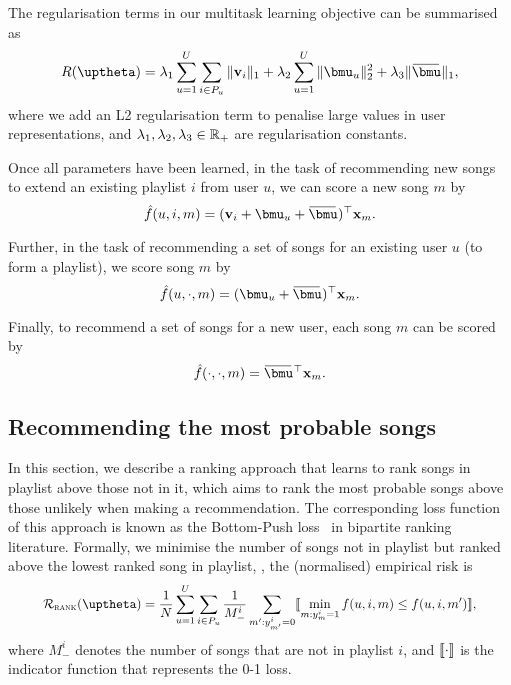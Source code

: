 The regularisation terms in our multitask learning objective can be summarised as
\begin{equation}
\label{eq:reg}
R(\uptheta) = \lambda_1 \sum_{u=1}^U \sum_{i \in P_u} \|\bv_i\|_1 + \lambda_2 \sum_{u=1}^U \|\bmu_u\|_2^2 + \lambda_3 \|\widebar\bmu\|_1,
\end{equation}
where we add an L2 regularisation term to penalise large values in user representations,
and $\lambda_1, \lambda_2, \lambda_3 \in \mathbb{R}_+$ are regularisation constants.

Once all parameters have been learned, in the task of recommending new songs to extend an existing playlist $i$ from user $u$, 
we can score a new song $m$ by
$$
\hat f(u, i, m) = (\bv_i + \bmu_u + \widebar\bmu)^\top \x_m.
$$

Further, in the task of recommending a set of songs for an existing user $u$ (to form a playlist), 
we score song $m$ by
$$
\hat f(u, \cdot, m) = (\bmu_u + \widebar\bmu)^\top \x_m.
$$

Finally, to recommend a set of songs for a new user, each song $m$ can be scored by
$$
\hat f(\cdot, \cdot, m) = \widebar\bmu^\top \x_m.
$$


\subsection{Recommending the most probable songs}
\label{ssec:bploss}

In this section, we describe a ranking approach that learns to rank songs in playlist above
those not in it, which aims to rank the most probable songs above those unlikely when making a recommendation.
The corresponding loss function of this approach is known as the Bottom-Push loss~\cite{rudin2009p} in bipartite ranking literature.
Formally, we minimise the number of songs not in playlist but ranked above the lowest ranked song in playlist,
\ie, the (normalised) empirical risk is
\begin{equation}
\label{eq:bprisk}
\resizebox{.9\linewidth}{!}{$\displaystyle
\RCal_\textsc{rank}(\uptheta) = \frac{1}{N} \sum_{u=1}^U \sum_{i \in P_u} \frac{1}{M_-^i} \sum_{m': y_{m'}^i = 0} 
\llb \min_{m: y_m^i = 1} f(u, i, m) \le f(u, i, m') \rrb,
$}
\end{equation}
where $M_-^i$ denotes the number of songs that are not in playlist $i$,
and $\llbracket \cdot \rrbracket$ is the indicator function that represents the 0-1 loss.

